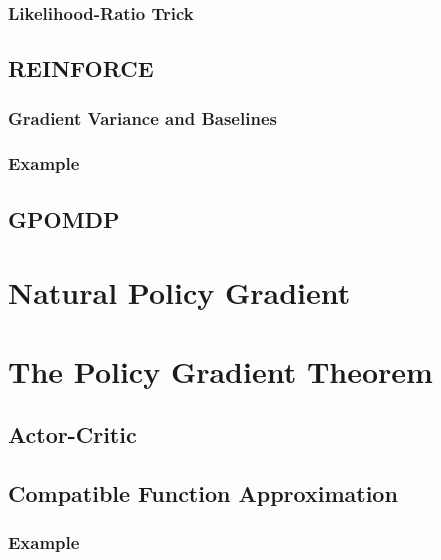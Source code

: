 			\subsubsection{Likelihood-Ratio Trick} %

		\subsection{REINFORCE} %

			\subsubsection{Gradient Variance and Baselines} %

			\subsubsection{Example} %

		\subsection{GPOMDP} %

	\section{Natural Policy Gradient} %

	\section{The Policy Gradient Theorem} %

		\subsection{Actor-Critic} %

		\subsection{Compatible Function Approximation} %

			\subsubsection{Example} %

